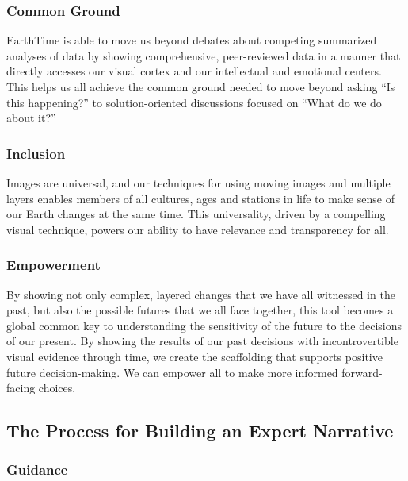 \documentclass[
  12pt,
]{krantz}
\begin{document}
\hypertarget{common-ground}{%
\subsubsection*{Common Ground}\label{common-ground}}


EarthTime is able to move us beyond debates about competing summarized analyses of data by showing comprehensive, peer-reviewed data in a manner that directly accesses our visual cortex and our intellectual and emotional centers. This helps us all achieve the common ground needed to move beyond asking ``Is this happening?'' to solution-oriented discussions focused on ``What do we do about it?''

\hypertarget{inclusion}{%
\subsubsection*{Inclusion}\label{inclusion}}


Images are universal, and our techniques for using moving images and multiple layers enables members of all cultures, ages and stations in life to make sense of our Earth changes at the same time. This universality, driven by a compelling visual technique, powers our ability to have relevance and transparency for all.

\hypertarget{empowerment}{%
\subsubsection*{Empowerment}\label{empowerment}}


By showing not only complex, layered changes that we have all witnessed in the past, but also the possible futures that we all face together, this tool becomes a global common key to understanding the sensitivity of the future to the decisions of our present. By showing the results of our past decisions with incontrovertible visual evidence through time, we create the scaffolding that supports positive future decision-making. We can empower all to make more informed forward-facing choices.

\hypertarget{the-process-for-building-an-expert-narrative}{%
\subsection{The Process for Building an Expert Narrative}\label{the-process-for-building-an-expert-narrative}}

\hypertarget{guidance}{%
\subsubsection*{Guidance}\label{guidance}}
\end{document}
